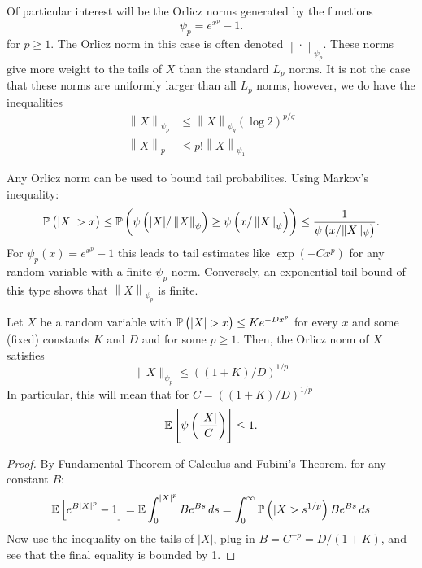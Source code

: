 \begin{remark}
    \label{rem:orlicz-p-norm}
	Of particular interest will be the Orlicz norms generated by the functions
	\[
		\psi_p = e^{x^p}-1
	.\] 
	for \(p\geq 1\). The Orlicz norm in this case is often denoted \(\left\|\cdot\right\|_{\psi_p}\).  These norms give more weight to the tails of \(X\) than the standard  \(L_p\) norms. It is not the case that these norms are uniformly larger than all \(L_p\) norms, however, we do have the inequalities
	\begin{align*}
		\left\|X\right\|_{\psi_p} &\leq \left\|X\right\|_{\psi_q}\left(\log 2\right)^{p/q}\\ 
		\left\|X\right\|_p &\leq p!\left\|X\right\|_{\psi_1}
	\end{align*}
\end{remark}

\begin{remark}
    \label{rem:orlicz}
	Any Orlicz norm can be used to bound tail probabilites. Using Markov's inequality:
	\[
		\P\left(\left|X\right|>x\right)\leq \P\left(\psi\left(|X|/\left\|X\right\|_\psi\right)\geq \psi\left(x/\left\|X\right\|_\psi\right)\right) \leq \frac{1}{\psi\left(x/\|X\|_\psi\right)} 
	.\] 
	For \(\psi_p(x) = e^{x^p}-1\) this leads to tail estimates like  \(\exp\left(-Cx^p\right)\) for any random variable with a finite \(\psi_p\)-norm. Conversely, an exponential tail bound of this type shows that  \(\left\|X\right\|_{\psi_p}\) is finite.
\end{remark}

\begin{lemma}
	\label{lemma:vdv2.2.1}
	Let \(X\) be a random variable  with  \(\P\left(|X|>x\right)\leq Ke^{-Dx^p}\) for every \(x\) and some (fixed) constants  \(K\) and  \(D\) and for some  \(p \geq 1\). Then, the Orlicz norm of \(X\) satisfies  \[\|X\|_{\psi_p}\leq \left((1+K)/D\right)^{1/p}\]
	In particular, this will mean that for \(C = \left((1+K)/D\right)^{1/p}\)
	\[
	    \mathbb{E}\left[\psi\left(\frac{|X|}{C}\right)\right]\leq 1
	.\] 
\end{lemma}
\begin{proof}
	By Fundamental Theorem of Calculus and Fubini's Theorem, for any constant \(B\):
	\begin{align*}
		\mathbb{E}\left[e^{B|X|^p}-1\right]= \mathbb{E}\int_0^{|X|^p}Be^{Bs}\,ds = \int_0^\infty \mathbb{P}\left(|X> s^{1/p}\right)Be^{Bs}\,ds
	\end{align*}
	Now use the inequality on the tails of \(|X|\), plug in \(B = C^{-p}= D/(1+K)\), and see that the final equality is bounded by 1.
\end{proof}

